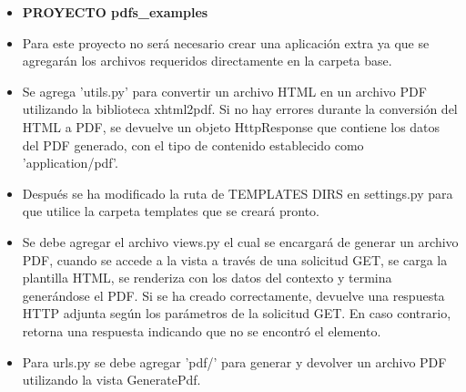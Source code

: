 \documentclass{article}
\begin{document}
        \begin{itemize}	
		\item \textbf{PROYECTO pdfs\_examples}
            \item Para este proyecto no será necesario crear una aplicación extra ya que se agregarán los archivos requeridos directamente en la carpeta base.
            \item Se agrega 'utils.py' para convertir un archivo HTML en un archivo PDF utilizando la biblioteca xhtml2pdf. Si no hay errores durante la conversión del HTML a PDF, se devuelve un objeto HttpResponse que contiene los datos del PDF generado, con el tipo de contenido establecido como 'application/pdf'.
        \end{itemize} 
          
        \begin{itemize}
            \item Después se ha modificado la ruta de TEMPLATES DIRS en settings.py para que utilice la carpeta templates que se creará pronto.
            \item Se debe agregar el archivo views.py el cual se encargará de generar un archivo PDF, cuando se accede a la vista a través de una solicitud GET, se carga la plantilla HTML, se renderiza con los datos del contexto y termina generándose el PDF. Si se ha creado correctamente, devuelve una respuesta HTTP adjunta según los parámetros de la solicitud GET. En caso contrario, retorna una respuesta indicando que no se encontró el elemento.
            \item Para urls.py se debe agregar 'pdf/' para generar y devolver un archivo PDF utilizando la vista GeneratePdf. 
        \end{itemize}
         
         
\end{document}
